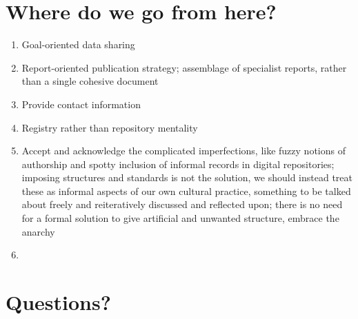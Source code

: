 \documentclass{article}
\begin{document}
\section{Where do we go from here?}
\begin{enumerate}
  \item Goal-oriented data sharing
  \item Report-oriented publication strategy; assemblage of specialist reports, rather than a single cohesive document
  \item Provide contact information
  \item Registry rather than repository mentality
  \item Accept and acknowledge the complicated imperfections, like fuzzy notions of authorship and spotty inclusion of informal records in digital repositories; imposing structures and standards is not the solution, we should instead treat these as informal aspects of our own cultural practice, something to be talked about freely and reiteratively discussed and reflected upon; there is no need for a formal solution to give artificial and unwanted structure, embrace the anarchy
\item \end{enumerate}

\section{Questions?}
\end{document}
